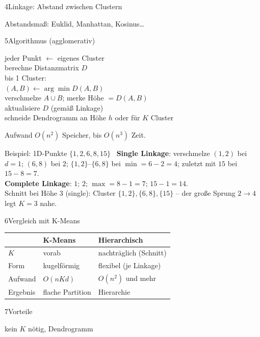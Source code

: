 \begin{hngrid}
\begin{hnp}[raster multicolumn=3,acc=hnnavy]{4}{Linkage: Abstand zwischen Clustern}
\begin{itemize}
\end{itemize}
Abstandsmaß: Euklid, Manhattan, Kosinus\dots
\end{hnp}
%
\begin{hnp}[raster multicolumn=3,acc=hngreen]{5}{Algorithmus (agglomerativ)}
\begin{pcode}
jeder Punkt $\leftarrow$ eigenes Cluster\\
berechne Distanzmatrix $D$\\
 bis 1 Cluster:\\
\hii $(A,B)\leftarrow\arg\min D(A,B)$ \ \\
\hii verschmelze $A\cup B$; merke Höhe $=D(A,B)$\\
\hii aktualisiere $D$ (gemäß Linkage)\\
schneide Dendrogramm an Höhe $h$ oder für $K$ Cluster
\end{pcode}
Aufwand $O(n^2)$ Speicher, bis $O(n^3)$ Zeit.
\end{hnp}
%
\begin{hnex}[raster multicolumn=3]{Beispiel: 1D-Punkte $\{1,2,6,8,15\}$}
\hnsol\ \textbf{Single Linkage}: verschmelze $(1,2)$ bei $d=1$; $(6,8)$ bei $2$; $\{1,2\}\text{--}\{6,8\}$ bei $\min=6-2=4$; zuletzt mit $15$ bei $15-8=7$.\\
\textbf{Complete Linkage}: $1;\,2;\,\max=8-1=7;\,15-1=14$.\\
Schnitt bei Höhe $3$ (single): Cluster $\{1,2\},\{6,8\},\{15\}$ -- der große Sprung $2\to4$ legt $K=3$ nahe.
\end{hnex}
%
\begin{hnp}[raster multicolumn=3,acc=hnrose]{6}{Vergleich mit K-Means}
\renewcommand{\arraystretch}{1.22}
\begin{tabular}{@{}p{1.5cm}p{3.3cm}p{3.5cm}@{}}
\hline
&\textbf{K-Means}&\textbf{Hierarchisch}\\\hline
$K$&vorab&nachträglich (Schnitt)\\
Form&kugelförmig&flexibel (je Linkage)\\
Aufwand&$O(nKd)$&$O(n^2)$ und mehr\\
Ergebnis&flache Partition&Hierarchie\\\hline
\end{tabular}
\end{hnp}
%
\begin{hnp}[raster multicolumn=2,acc=hngreen]{7}{Vorteile}
\begin{hnpro}
\item kein $K$ nötig, Dendrogramm

\end{hnpro}
\end{hnp}
\end{hngrid}
